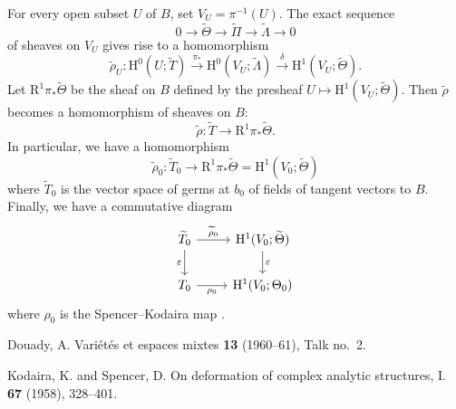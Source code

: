 \documentclass{article}
\theoremstyle{plain}
\theoremstyle{definition}
\newcommand{\HH}{\mathrm{H}}
\newcommand{\oldpage}[1]{\marginpar{\footnotesize$\Big\vert$ \textit{p.~#1}}}
\begin{document}
For every open subset $U$ of $B$, set $V_U=\pi^{-1}(U)$.
The exact sequence
\[
  0 \to \widetilde{\Theta} \to \widetilde{\Pi} \to \widetilde{\Lambda} \to 0
\]
of sheaves on $V_U$ gives rise to a homomorphism
\[
  \widetilde{\rho}_U\colon
  \HH^0(U;\widetilde{T})
  \xrightarrow{\pi_*} \HH^0(V_U;\widetilde{\Lambda})
  \xrightarrow{\delta} \HH^1(V_U;\widetilde{\Theta}).
\]
Let $\mathrm{R}^1\pi_*\widetilde{\Theta}$ be the sheaf on $B$ defined by the presheaf $U\mapsto\HH^1(V_U;\widetilde{\Theta})$.
Then $\widetilde{\rho}$ becomes a homomorphism of sheaves on $B$:
\[
  \widetilde{\rho}\colon \widetilde{T} \to \mathrm{R}^1\pi_*\widetilde{\Theta}.
\]
In particular, we have a homomorphism
\[
  \widetilde{\rho}_0\colon
  \widetilde{T}_0
  \to \mathrm{R}^1\pi_*\widetilde{\Theta}
  = \HH^1(V_0;\widetilde{\Theta})
\]
where $\widetilde{T}_0$ is the vector space of germs at $b_0$ of fields of tangent vectors to $B$.
Finally, we have a commutative diagram
\oldpage{3-02}
\[
  \begin{tikzcd}
    \widetilde{T}_0 \rar["\widetilde{\rho}_0"] \dar[swap,"\varepsilon"]
    & \HH^1(V_0;\widetilde{\Theta}) \dar["\varepsilon"]
  \\T_0 \rar[swap,"\rho_0"]
    & \HH^1(V_0;\Theta_0)
  \end{tikzcd}
\]
where $\rho_0$ is the Spencer--Kodaira map \cite{2}.




\nocite{*}

\begin{thebibliography}{2}

  {\sc Douady, A.}
  \newblock Vari\'{e}t\'{e}s et espaces mixtes
   \textbf{13} (1960--61), Talk no.~2.

  {\sc Kodaira, K. and Spencer, D.}
  \newblock On deformation of complex analytic structures, I.
   \textbf{67} (1958), 328--401.

\end{thebibliography}
\end{document}
